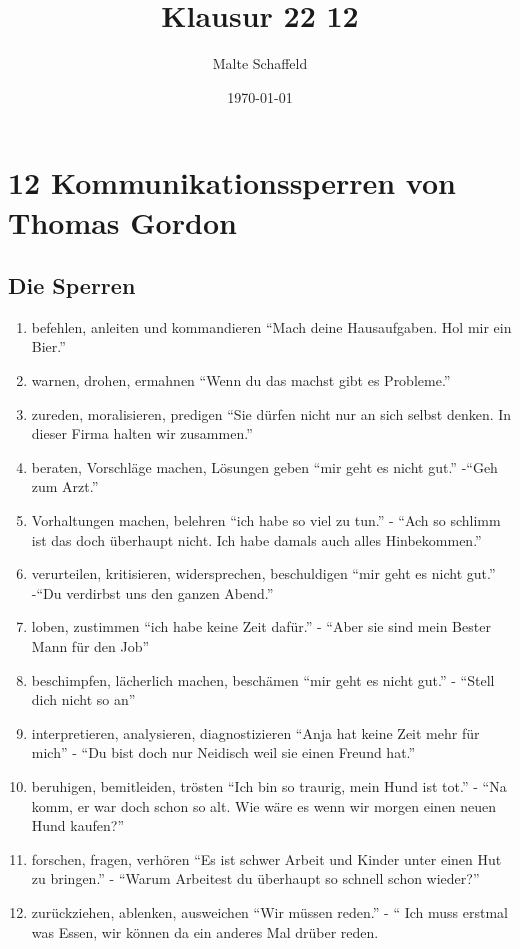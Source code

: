 \documentclass[11pt]{article}
\author{Malte Schaffeld}
\date{\today}
\title{Klausur 22 12}
\begin{document}
\maketitle
\tableofcontents


\section{12 Kommunikationssperren von Thomas Gordon}
\label{sec:org44aae26}
\subsection{Die Sperren}
\label{sec:org4e5e457}
\begin{enumerate}
\item befehlen, anleiten und kommandieren
``Mach deine Hausaufgaben. Hol mir ein Bier.''
\item warnen, drohen, ermahnen
``Wenn du das machst gibt es Probleme.''
\item zureden, moralisieren, predigen
``Sie dürfen nicht nur an sich selbst denken. In dieser Firma halten wir zusammen.''
\item beraten, Vorschläge machen, Lösungen geben
``mir geht es nicht gut.'' -``Geh zum Arzt.''
\item Vorhaltungen machen, belehren
``ich habe so viel zu tun.'' - ``Ach so schlimm ist das doch überhaupt nicht. Ich habe damals auch alles Hinbekommen.''
\item verurteilen, kritisieren, widersprechen, beschuldigen
``mir geht es nicht gut.'' -``Du verdirbst uns den ganzen Abend.''
\item loben, zustimmen
``ich habe keine Zeit dafür.'' - ``Aber sie sind mein Bester Mann für den Job''
\item beschimpfen, lächerlich machen, beschämen
``mir geht es nicht gut.'' - ``Stell dich nicht so an''
\item interpretieren, analysieren, diagnostizieren
``Anja hat keine Zeit mehr für mich'' - ``Du bist doch nur Neidisch weil sie einen Freund hat.''
\item beruhigen, bemitleiden, trösten
``Ich bin so traurig, mein Hund ist tot.'' - ``Na komm, er war doch schon so alt. Wie wäre es wenn wir morgen einen neuen Hund kaufen?''
\item forschen, fragen, verhören
``Es ist schwer Arbeit und Kinder unter einen Hut zu bringen.'' - ``Warum Arbeitest du überhaupt so schnell schon wieder?''
\item zurückziehen, ablenken, ausweichen
``Wir müssen reden.'' - `` Ich muss erstmal was Essen, wir können da ein anderes Mal drüber reden.
\end{enumerate}
\end{document}
